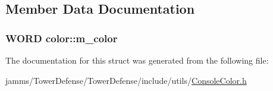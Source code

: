 \subsection{Member Data Documentation}
\hypertarget{structcolor_a899a29a2834627301d67fd52ed970043}{
\subsubsection[{m\+\_\+color}]{\setlength{\rightskip}{0pt plus 5cm}W\+O\+R\+D color\+::m\+\_\+color}}\label{structcolor_a899a29a2834627301d67fd52ed970043}


The documentation for this struct was generated from the following file\+:\begin{DoxyCompactItemize}
\item 
jamms/\+Tower\+Defense/\+Tower\+Defense/include/utils/\hyperlink{_console_color_8h}{Console\+Color.\+h}\end{DoxyCompactItemize}
